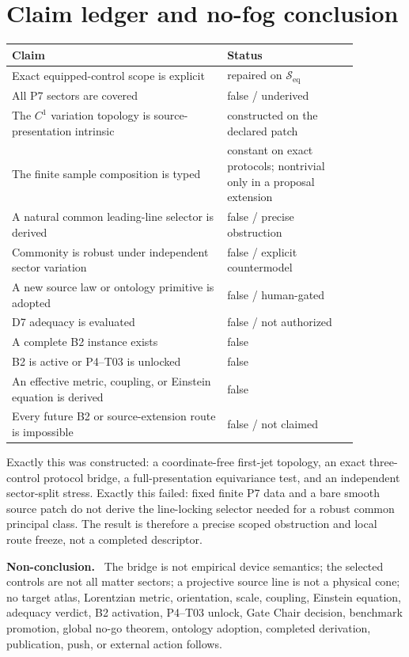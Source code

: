 \documentclass[11pt]{article}
\newenvironment{nonconclusion}{\par\smallskip\noindent\textbf{Non-conclusion.}\ }{\par\smallskip}
\newcommand{\Seq}{\mathcal S_{\mathrm{eq}}}
\begin{document}
\section{Claim ledger and no-fog conclusion}

\begin{center}
\begin{tabular}{>{\raggedright\arraybackslash}p{0.54\linewidth}>{\raggedright\arraybackslash}p{0.33\linewidth}}
\toprule
Claim & Status\\ \midrule
Exact equipped-control scope is explicit & repaired on \(\Seq\)\\
All P7 sectors are covered & false / underived\\
The \(C^1\) variation topology is source-presentation intrinsic & constructed on the declared patch\\
The finite sample composition is typed & constant on exact protocols; nontrivial only in a proposal extension\\
A natural common leading-line selector is derived & false / precise obstruction\\
Commonity is robust under independent sector variation & false / explicit countermodel\\
A new source law or ontology primitive is adopted & false / human-gated\\
D7 adequacy is evaluated & false / not authorized\\
A complete B2 instance exists & false\\
B2 is active or P4--T03 is unlocked & false\\
An effective metric, coupling, or Einstein equation is derived & false\\
Every future B2 or source-extension route is impossible & false / not claimed\\
\bottomrule
\end{tabular}
\end{center}

Exactly this was constructed: a coordinate-free first-jet topology, an exact
three-control protocol bridge, a full-presentation equivariance test, and an
independent sector-split stress.  Exactly this failed: fixed finite P7 data and
a bare smooth source patch do not derive the line-locking selector needed for a
robust common principal class.  The result is therefore a precise scoped
obstruction and local route freeze, not a completed descriptor.

\begin{nonconclusion}
The bridge is not empirical device semantics; the selected controls are not
all matter sectors; a projective source line is not a physical cone; no target
atlas, Lorentzian metric, orientation, scale, coupling, Einstein equation,
adequacy verdict, B2 activation, P4--T03 unlock, Gate Chair decision, benchmark
promotion, global no-go theorem, ontology adoption, completed derivation,
publication, push, or external action follows.
\end{nonconclusion}
\end{document}
